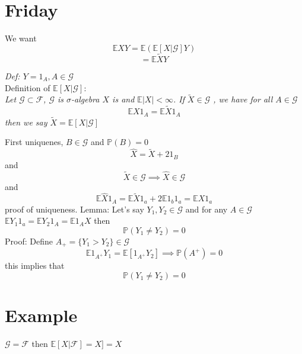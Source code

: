 \documentclass[11pt]{article}
\begin{document}
\section{Friday}

We want
\[
    \mathbb{E} X Y = \mathbb{E}( \mathbb{E}[X | \mathcal{G}] Y)
\] 
\[
= \mathbb{E}\tilde X Y
\] 

\emph{
    Def: $Y = 1_A, A \in \mathcal{G}$
}\\
Definition of $ \mathbb{E}[X | \mathcal{G}]$:\\
\emph{
    Let $\mathcal{G} \subset \mathcal{F}$, $\mathcal{G}$ is  $\sigma$-algebra $X$ is and  $ \mathbb{E}|X| < \infty$.
    If $\tilde X \in \mathcal{G}$ , we have for all  $A \in \mathcal{G}$
     \[
    \mathbb{E} X 1_A = \mathbb{E} \tilde X 1_A
    \] 
    then we say $\tilde X = \mathbb{E}[X | \mathcal{G}]$
}

First uniquenes, $B \in \mathcal{G}$ and  $ \mathbb{P}(B) = 0$
\[
\hat X = \tilde X + 2 1_B
\] 
and
\[
    \tilde X \in \mathcal{G} \implies \hat X \in \mathcal{G}
\] 
and
\[
\mathbb{E} \hat X 1_A = \mathbb{E} \tilde X 1_a + 2 \mathbb{E}1_b 1_a = \mathbb{E} X 1_a
\] 
proof of uniqueness.
Lemma: Let's say $Y_1,Y_2 \in \mathcal{G}$  and for any $A \in \mathcal{G}$  $ \mathbb{E}Y_1 1_a = \mathbb{E}Y_2 1_A = \mathbb{E}1_A X$ then
\[
\mathbb{P}(Y_1 \ne Y_2) = 0
\] 
Proof: Define $A_+ = \{Y_1 > Y_2\} \in \mathcal{G}$
\[
    \mathbb{E}1_{A^{+}}Y_1 = \mathbb{E}[1_{A^{+}}Y_2] \implies \mathbb{P}(A^{+}) = 0
\] 
this implies that
\[
\mathbb{P}(Y_1 \ne Y_2) = 0
\] 

\section{Example}
$\mathcal{G} = \mathcal{F}$ then $ \mathbb{E}[X | \mathcal{F}] = X] = X$
\end{document}
